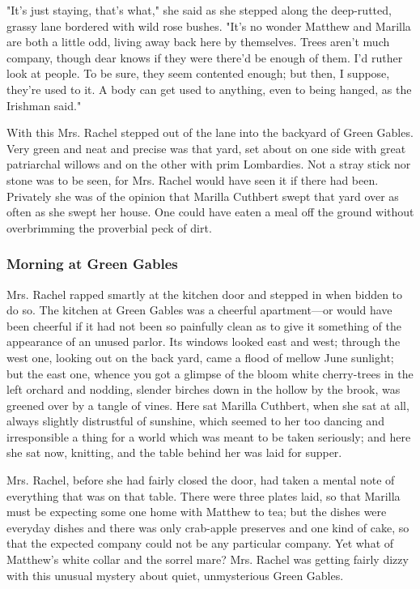 \documentclass{article}
\begin{document}
"It's just staying, that's what," she said as she stepped along the deep-rutted, grassy lane bordered with wild rose bushes. "It's no wonder Matthew and Marilla are both a little odd, living away back here by themselves. Trees aren't much company, though dear knows if they were there'd be enough of them. I'd ruther look at people. To be sure, they seem contented enough; but then, I suppose, they're used to it. A body can get used to anything, even to being hanged, as the Irishman said."

With this Mrs. Rachel stepped out of the lane into the backyard of Green Gables. Very green and neat and precise was that yard, set about on one side with great patriarchal willows and on the other with prim Lombardies. Not a stray stick nor stone was to be seen, for Mrs. Rachel would have seen it if there had been. Privately she was of the opinion that Marilla Cuthbert swept that yard over as often as she swept her house. One could have eaten a meal off the ground without overbrimming the proverbial peck of dirt.

\subsubsection{Morning at Green Gables}
Mrs. Rachel rapped smartly at the kitchen door and stepped in when bidden to do so. The kitchen at Green Gables was a cheerful apartment---or would have been cheerful if it had not been so painfully clean as to give it something of the appearance of an unused parlor. Its windows looked east and west; through the west one, looking out on the back yard, came a flood of mellow June sunlight; but the east one, whence you got a glimpse of the bloom white cherry-trees in the left orchard and nodding, slender birches down in the hollow by the brook, was greened over by a tangle of vines. Here sat Marilla Cuthbert, when she sat at all, always slightly distrustful of sunshine, which seemed to her too dancing and irresponsible a thing for a world which was meant to be taken seriously; and here she sat now, knitting, and the table behind her was laid for supper.

Mrs. Rachel, before she had fairly closed the door, had taken a mental note of everything that was on that table. There were three plates laid, so that Marilla must be expecting some one home with Matthew to tea; but the dishes were everyday dishes and there was only crab-apple preserves and one kind of cake, so that the expected company could not be any particular company. Yet what of Matthew's white collar and the sorrel mare? Mrs. Rachel was getting fairly dizzy with this unusual mystery about quiet, unmysterious Green Gables.
\end{document}
